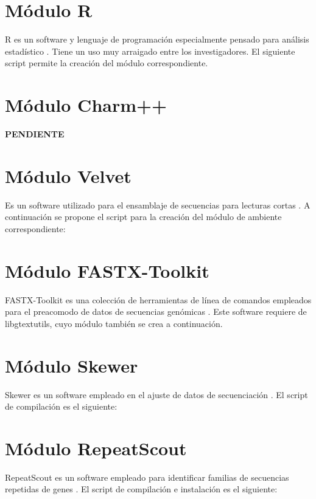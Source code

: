 

\section{Módulo R}
R es un software y lenguaje de programación especialmente pensado para análisis estadístico \cite{R}. Tiene un uso muy arraigado entre los investigadores. El siguiente script permite la creación del módulo correspondiente.



\section{Módulo Charm++}
\textbf{\huge{PENDIENTE}}

\section{Módulo Velvet}
Es un software utilizado para el ensamblaje de secuencias para lecturas cortas \cite{velvet}. A continuación se propone el script para la creación del módulo de ambiente correspondiente:



\section{Módulo FASTX-Toolkit }
FASTX-Toolkit es una colección de herramientas de línea de comandos empleados para el preacomodo de datos de secuencias genómicas \cite{fastx-toolkit}. Este software requiere de libgtextutils, cuyo módulo también se crea a continuación.





\section{Módulo Skewer}
Skewer es un software empleado en el ajuste de datos de secuenciación \cite{skewer}. El script de compilación es el siguiente:



\section{Módulo RepeatScout}
RepeatScout es un software empleado para identificar familias de secuencias repetidas de genes \cite{repeatscout00}\cite{repeatscout01}. El script de compilación e instalación es el siguiente:

